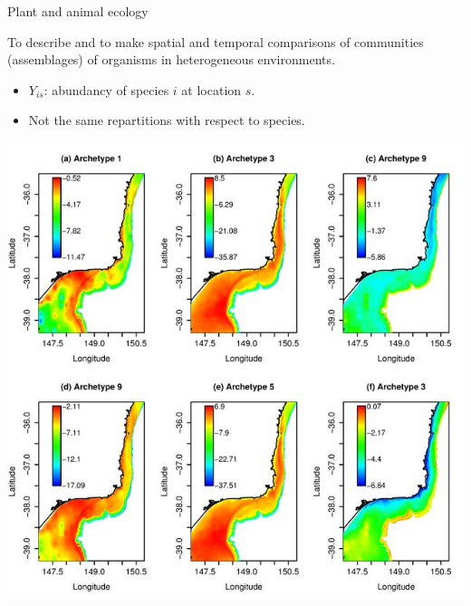 \documentclass[compress,10pt]{beamer}
\begin{document}
\begin{frame}[allowframebreaks]{Plant and animal ecology}

To describe and to make spatial and temporal comparisons of communities (assemblages) of organisms in heterogeneous environments.
 
 
\begin{itemize}
 \item $Y_{is}$: abundancy of species $i$ at location $s$.
 \item Not the same repartitions with respect to species. 
\end{itemize}



\begin{center}
  \includegraphics[scale = 0.27]{ecology_spatial_archetypes}   
\end{center}
     
\cite{Dunstan2013}


\end{frame}
\end{document}
